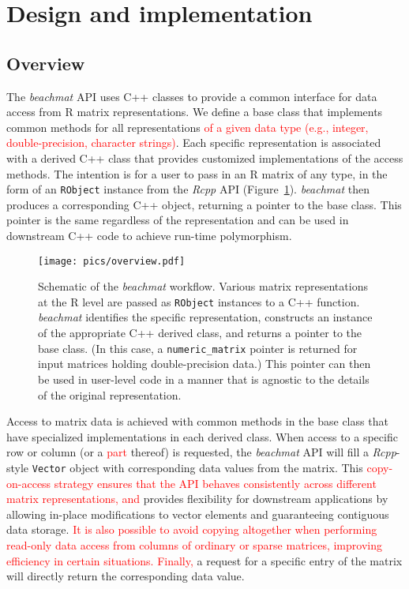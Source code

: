 \documentclass[10pt,letterpaper]{article}
\newcommand{\beachmat}{\textit{beachmat}}
\newcommand{\code}[1]{\texttt{#1}}
\newcommand{\revised}[1]{\textcolor{red}{#1}}
\begin{document}
\section*{Design and implementation}

\subsection*{Overview}
The \beachmat{} API uses C++ classes to provide a common interface for data access from R matrix representations.
We define a base class that implements common methods for all representations \revised{of a given data type (e.g., integer, double-precision, character strings)}.
Each specific representation is associated with a derived C++ class that provides customized implementations of the access methods.
The intention is for a user to pass in an R matrix of any type, in the form of an \code{RObject} instance from the \textit{Rcpp} API (Figure~\ref{fig:beachoverview}).
\beachmat{} then produces a corresponding C++ object, returning a pointer to the base class.
This pointer is the same regardless of the representation and can be used in downstream C++ code to achieve run-time polymorphism.

\begin{figure}[btp]
    \begin{center}
        \texttt{[image: pics/overview.pdf]}
    \end{center}
    \caption{Schematic of the \beachmat{} workflow.
        Various matrix representations at the R level are passed as \code{RObject} instances to a C++ function.
        \beachmat{} identifies the specific representation, constructs an instance of the appropriate C++ derived class, and returns a pointer to the base class.
        (In this case, a \code{numeric\_matrix} pointer is returned for input matrices holding double-precision data.)
        This pointer can then be used in user-level code in a manner that is agnostic to the details of the original representation.
    }
    \label{fig:beachoverview}
\end{figure}

Access to matrix data is achieved with common methods in the base class that have specialized implementations in each derived class. 
When access to a specific row or column (or a \revised{part} thereof) is requested, the \beachmat{} API will fill a \textit{Rcpp}-style \code{Vector} object with corresponding data values from the matrix.
This \revised{copy-on-access strategy ensures that the API behaves consistently across different matrix representations, and} provides flexibility for downstream applications by allowing in-place modifications to vector elements and guaranteeing contiguous data storage. 
\revised{It is also possible to avoid copying altogether when performing read-only data access from columns of ordinary or sparse matrices, improving efficiency in certain situations.
Finally,} a request for a specific entry of the matrix will directly return the corresponding data value.
\end{document}
